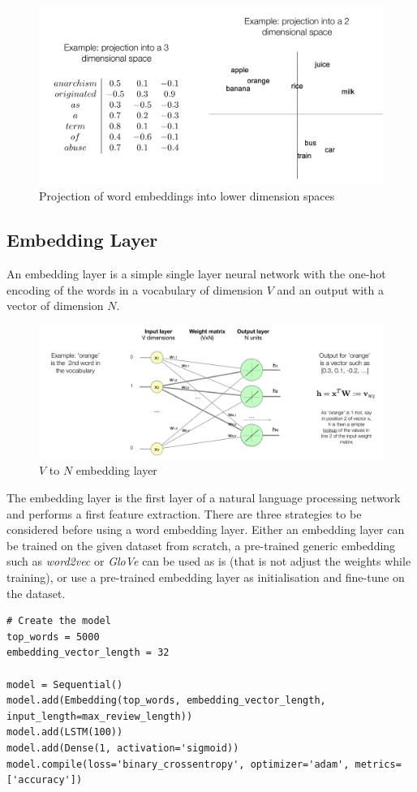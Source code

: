 \documentclass[11pt]{article}
\begin{document}
\begin{figure}[tbh]
	\centering
	\includegraphics[width=0.6\linewidth]{img/word_embedding_projections}
	\caption{Projection of word embeddings into lower dimension spaces}
	\label{fig:wordembeddingprojections}
\end{figure}

\subsection{Embedding Layer}
An embedding layer is a simple single layer neural network with the one-hot encoding of the words in a vocabulary of dimension $V$ and an output with a vector of dimension $N$.

\begin{figure}[tbh]
	\centering
	\includegraphics[width=0.8\linewidth]{img/word_embedding_layer}
	\caption{$V$ to $N$ embedding layer}
	\label{fig:wordembeddinglayer}
\end{figure}

The embedding layer is the first layer of a natural language processing network and performs a first feature extraction. There are three strategies to be considered before using a word embedding layer. Either an embedding layer can be trained on the given dataset from scratch, a pre-trained generic embedding such as \emph{word2vec} or \emph{GloVe} can be used as is (that is not adjust the weights while training), or use a pre-trained embedding layer as initialisation and fine-tune on the dataset.

\begin{verbatim}
# Create the model
top_words = 5000
embedding_vector_length = 32

model = Sequential()
model.add(Embedding(top_words, embedding_vector_length, input_length=max_review_length))
model.add(LSTM(100))
model.add(Dense(1, activation='sigmoid))
model.compile(loss='binary_crossentropy', optimizer='adam', metrics=['accuracy'])
\end{verbatim}
\end{document}
